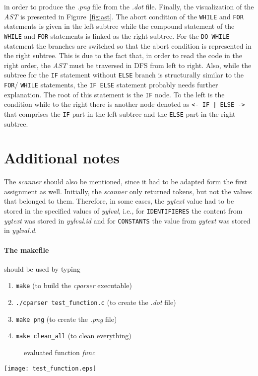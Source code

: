 \documentclass{scrartcl}
\begin{document}
in order to produce the \textit{.png} file from the \textit{.dot} file. Finally, the visualization of the \textit{AST} is presented in Figure~\ref{fig:ast}.
The abort condition of the \texttt{WHILE} and \texttt{FOR} statements is given in the left subtree while the compound statement of the \texttt{WHILE} and \texttt{FOR} statements is linked as the right subtree. For the \texttt{DO WHILE} statement the branches are switched so that the abort condition is represented in the right subtree. This is due to the fact that, in order to read the code in the right order, the \textit{AST} must be traversed in DFS from left to right. Also, while the subtree for the \texttt{IF} statement without \texttt{ELSE} branch is structurally similar to the \texttt{FOR}/ \texttt{WHILE} statements, the \texttt{IF ELSE} statement probably needs further explanation. The root of this statement is the \texttt{IF} node. To the left is the condition while to the right there is another node denoted as \texttt{<- IF | ELSE ->} that comprises the \texttt{IF} part in the left subtree and the \texttt{ELSE} part in the right subtree.

\section*{Additional notes}
The \textit{scanner} should also be mentioned, since it had to be adapted form the first assignment as well. Initially, the \textit{scanner} only returned tokens, but not the values that belonged to them. Therefore, in some cases, the \textit{yytext} value had to be stored in the specified values of \textit{yylval}, i.e., for \texttt{IDENTIFIERES} the content from \textit{yytext} was stored in \textit{yylval.id} and for \texttt{CONSTANTS} the value from \textit{yytext} was stored in \textit{yylval.d}.\\

\paragraph{The makefile} should be used by typing
\begin{enumerate}
\item \texttt{make} (to build the \textit{cparser} executable)
\item \texttt{./cparser test\_function.c} (to create the \textit{.dot} file)
\item \texttt{make png} (to create the \textit{.png} file)
\item \texttt{make clean\_all} (to clean everything)
\end{enumerate}
\begin{figure}[H]

\caption{evaluated function \textit{func}}
\label{fig:func}
\end{figure}

\begin{sidewaysfigure}
	\centering
	\texttt{[image: test\_function.eps]}
	\caption{the \textit{AST} for the function \textit{func} in Figure~\ref{fig:func}.}
	\label{fig:ast}
\end{sidewaysfigure}



\end{document}
